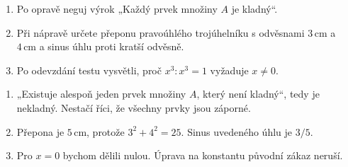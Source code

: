\documentclass[11pt,a4paper]{article}
\begin{document}
\begin{zadaniReseniBox}[title={Procvičení},breakable=false]
\begin{enumerate}[label=\alph*)]
\item Po opravě neguj výrok „Každý prvek množiny $A$ je kladný“.
\item Při nápravě určete přeponu pravoúhlého trojúhelníku s odvěsnami $3\,\mathrm{cm}$ a $4\,\mathrm{cm}$ a sinus úhlu proti kratší odvěsně.
\item Po odevzdání testu vysvětli, proč $x^3:x^3=1$ vyžaduje $x\ne0$.
\end{enumerate}
\tcblower
\begin{enumerate}[label=\alph*)]
\item „Existuje alespoň jeden prvek množiny $A$, který není kladný“, tedy je nekladný. Nestačí říci, že všechny prvky jsou záporné.
\item Přepona je $5\,\mathrm{cm}$, protože $3^2+4^2=25$. Sinus uvedeného úhlu je $3/5$.
\item Pro $x=0$ bychom dělili nulou. Úprava na konstantu původní zákaz neruší.
\end{enumerate}
\end{zadaniReseniBox}


\end{document}

